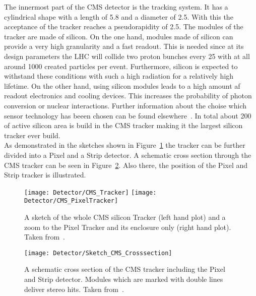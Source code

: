 The innermost part of the CMS detector is the tracking system. It has a cylindrical shape with a length of 5.8\m{} and a diameter of 2.5\m{}. With this the acceptance of the tracker reaches a pseudorapidity of 2.5. The modules of the tracker are made of silicon. On the one hand, modules made of silicon can provide a very high granularity and a fast readout. This is needed since at its design parameters the LHC will collide two proton bunches every 25\ns{} with at all around 1000 created particles per event. Furthermore, silicon is expected to withstand these conditions with such a high radiation for a relatively high lifetime. On the other hand, using silicon modules leads to a high amount af readout electronics and cooling devices. This increases the probability of photon conversion or nuclear interactions. Further information about the choise which sensor technology has beeen chosen can be found elsewhere~\cite{Chatrchyan:1129810}. In total about 200\ms{} of active silicon area is build in the CMS tracker making it the largest silicon tracker ever build.\\
As demonstrated in the sketches shown in Figure~\ref{plot:LHCCMSTrackerCMS} the tracker can be further divided into a Pixel and a Strip detector. A schematic cross section through the CMS tracker can be seen in Figure~\ref{plot:LHCCMSTrackerCrossCMS}. Also there, the position of the Pixel and Strip tracker is illustrated.

\begin{figure}[!Hhtb]
    \centering
    \texttt{[image: Detector/CMS\_Tracker]}
    \texttt{[image: Detector/CMS\_PixelTracker]}
    \caption[Sketches of the CMS Tracker]{A sketch of the whole CMS silicon Tracker (left hand plot) and a zoom to the Pixel Tracker and its enclosure only (right hand plot). Taken from~. \label{plot:LHCCMSTrackerCMS}}
\end{figure}

\begin{figure}[!Hhtb]
    \centering
    \texttt{[image: Detector/Sketch\_CMS\_Crosssection]}
    \caption[Schematic cross section of the CMS Tracker]{A schematic cross section of the CMS tracker including the Pixel and Strip detector. Modules which are marked with double lines deliver stereo hits. Taken from~. \label{plot:LHCCMSTrackerCrossCMS}}
\end{figure}

